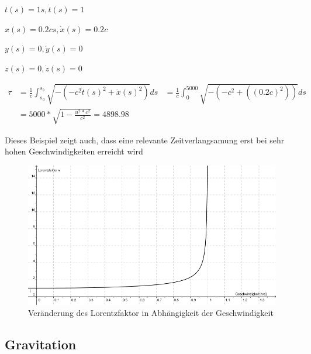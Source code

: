 \begin{refsection}
\begin{list}{}{}
    \item $t(s)=1s, \dot{t}(s)=1$
    \item $x(s)=0.2cs, \dot{x}(s)=0.2c$
    \item $y(s)=0, \dot{y}(s)=0$
    \item $z(s)=0, \dot{z}(s)=0$
\end{list}

\begin{align*}
    \tau
    &=
    \frac{1}{c}\int_{s_{a}}^{s_{b}}\sqrt{-(-c^2\dot{t}(s)^2+\dot{x}(s)^2)}ds
    &=
    \frac{1}{c}\int_{0}^{5000}\sqrt{-(-c^2+((0.2c)^2))}ds\\
    &=
    5000*\sqrt{1-\frac{u^2*c^2}{c^2}} = 4898.98
\end{align*}

Dieses Beispiel zeigt auch, dass eine relevante Zeitverlangsamung erst bei sehr hohen Geschwindigkeiten erreicht wird

\begin{figure}
    \centering
    \includegraphics[width=\hsize]{zeitreisen/Lorentzfaktor.jpg}
    \caption{Ver\"anderung des Lorentzfaktor in Abh\"angigkeit der Geschwindigkeit%
        \label{skript:geodaten:fig:transport}}
\end{figure}

\subsection{Gravitation}


\end{refsection}
